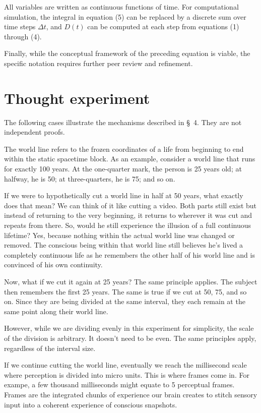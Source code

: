 \documentclass[11pt,a4paper]{article}
\begin{document}
All variables are written as continuous functions of time. For computational simulation, the integral in equation (5) can be replaced by a discrete sum over time steps $\Delta t$, and $D(t)$ can be computed at each step from equations (1) through (4).

Finally, while the conceptual framework of the preceding equation is viable, the specific notation requires further peer review and refinement.

\section{Thought experiment}

The following cases illustrate the mechanisms described in \S~4. They are not independent proofs.

The world line refers to the frozen coordinates of a life from beginning to end within the static spacetime block. As an example, consider a world line that runs for exactly 100 years. At the one-quarter mark, the person is 25 years old; at halfway, he is 50; at three-quarters, he is 75; and so on.

If we were to hypothetically cut a world line in half at 50 years, what exactly does that mean? We can think of it like cutting a video. Both parts still exist but instead of returning to the very beginning, it returns to wherever it was cut and repeats from there. So, would he still experience the illusion of a full continuous lifetime? Yes, because nothing within the actual world line was changed or removed. The conscious being within that world line still believes he's lived a completely continuous life as he remembers the other half of his world line and is convinced of his own continuity.

Now, what if we cut it again at 25 years? The same principle applies. The subject then remembers the first 25 years. The same is true if we cut at 50, 75, and so on. Since they are being divided at the same interval, they each remain at the same point along their world line.

However, while we are dividing evenly in this experiment for simplicity, the scale of the division is arbitrary. It doesn't need to be even. The same principles apply, regardless of the interval size.

If we continue cutting the world line, eventually we reach the millisecond scale where perception is divided into micro units. This is where frames come in. For exampe, a few thousand milliseconds might equate to 5 perceptual frames. Frames are the integrated chunks of experience our brain creates to stitch sensory input into a coherent experience of conscious snapshots.
\end{document}
